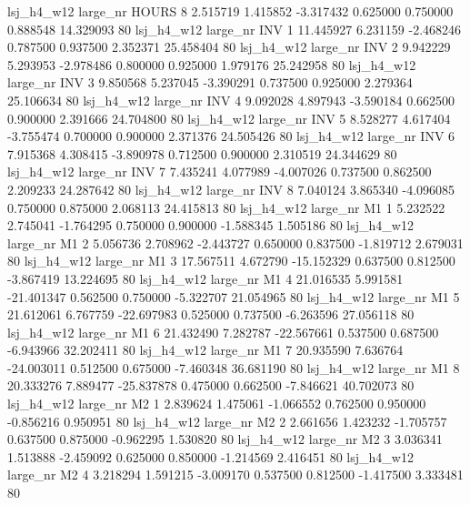   lsj_h4_w12   large_nr    HOURS                 8  2.515719  1.415852  -3.317432 0.625000 0.750000  0.888548   14.329093 80
  lsj_h4_w12   large_nr      INV                 1 11.445927  6.231159  -2.468246 0.787500 0.937500  2.352371   25.458404 80
  lsj_h4_w12   large_nr      INV                 2  9.942229  5.293953  -2.978486 0.800000 0.925000  1.979176   25.242958 80
  lsj_h4_w12   large_nr      INV                 3  9.850568  5.237045  -3.390291 0.737500 0.925000  2.279364   25.106634 80
  lsj_h4_w12   large_nr      INV                 4  9.092028  4.897943  -3.590184 0.662500 0.900000  2.391666   24.704800 80
  lsj_h4_w12   large_nr      INV                 5  8.528277  4.617404  -3.755474 0.700000 0.900000  2.371376   24.505426 80
  lsj_h4_w12   large_nr      INV                 6  7.915368  4.308415  -3.890978 0.712500 0.900000  2.310519   24.344629 80
  lsj_h4_w12   large_nr      INV                 7  7.435241  4.077989  -4.007026 0.737500 0.862500  2.209233   24.287642 80
  lsj_h4_w12   large_nr      INV                 8  7.040124  3.865340  -4.096085 0.750000 0.875000  2.068113   24.415813 80
  lsj_h4_w12   large_nr       M1                 1  5.232522  2.745041  -1.764295 0.750000 0.900000 -1.588345    1.505186 80
  lsj_h4_w12   large_nr       M1                 2  5.056736  2.708962  -2.443727 0.650000 0.837500 -1.819712    2.679031 80
  lsj_h4_w12   large_nr       M1                 3 17.567511  4.672790 -15.152329 0.637500 0.812500 -3.867419   13.224695 80
  lsj_h4_w12   large_nr       M1                 4 21.016535  5.991581 -21.401347 0.562500 0.750000 -5.322707   21.054965 80
  lsj_h4_w12   large_nr       M1                 5 21.612061  6.767759 -22.697983 0.525000 0.737500 -6.263596   27.056118 80
  lsj_h4_w12   large_nr       M1                 6 21.432490  7.282787 -22.567661 0.537500 0.687500 -6.943966   32.202411 80
  lsj_h4_w12   large_nr       M1                 7 20.935590  7.636764 -24.003011 0.512500 0.675000 -7.460348   36.681190 80
  lsj_h4_w12   large_nr       M1                 8 20.333276  7.889477 -25.837878 0.475000 0.662500 -7.846621   40.702073 80
  lsj_h4_w12   large_nr       M2                 1  2.839624  1.475061  -1.066552 0.762500 0.950000 -0.856216    0.950951 80
  lsj_h4_w12   large_nr       M2                 2  2.661656  1.423232  -1.705757 0.637500 0.875000 -0.962295    1.530820 80
  lsj_h4_w12   large_nr       M2                 3  3.036341  1.513888  -2.459092 0.625000 0.850000 -1.214569    2.416451 80
  lsj_h4_w12   large_nr       M2                 4  3.218294  1.591215  -3.009170 0.537500 0.812500 -1.417500    3.333481 80
